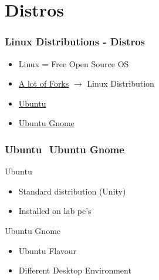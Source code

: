 \section{Distros}
\begin{frame}
	\frametitle{Linux Distributions - Distros}

	\begin{itemize}
		\item Linux = Free Open Source OS
        \item \href{https://upload.wikimedia.org/wikipedia/commons/1/1b/Linux_Distribution_Timeline.svg}{A lot of Forks} $\rightarrow$ Linux Distribution
	\end{itemize}
    \begin{itemize}
        \item \hyperlink{ubuntu}{Ubuntu}
        \item \hyperlink{ubuntu_gnome}{Ubuntu Gnome}
	\end{itemize}
\end{frame}

\begin{frame}[label=ubuntu]
	\frametitle{Ubuntu $ $ Ubuntu Gnome}
    Ubuntu
	\begin{itemize}
		\item Standard distribution (Unity)
		\item Installed on lab pc's
	\end{itemize}
    \vspace{0.5cm}
    Ubuntu Gnome
    \begin{itemize}
		\item Ubuntu Flavour
		\item Different Desktop Environment
	\end{itemize}
\end{frame}

